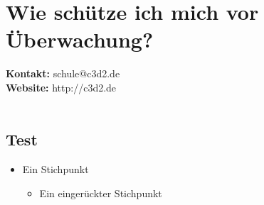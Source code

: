 \documentclass[a5paper]{scrartcl}
\begin{document}
\thispagestyle{empty}

\section*{Wie schütze ich mich vor Überwachung?}

\textbf{Kontakt:} schule@c3d2.de\\
\textbf{Website:} http://c3d2.de\\
\\
\subsection*{Test}
\begin{itemize}
  \item Ein Stichpunkt
    \begin{itemize}
      \item Ein eingerückter Stichpunkt
    \end{itemize}
\end{itemize}
\end{document}
